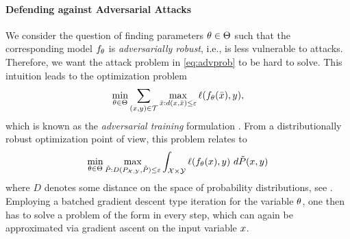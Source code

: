\paragraph{Defending against Adversarial Attacks}
%
%
We consider the question of finding parameters $\theta\in\Theta$ such that the corresponding model $f_\theta$ is \emph{adversarially robust}, i.e., is less vulnerable to attacks. Therefore, we want the attack problem in \cref{eq:advprob} to be hard to solve. This intuition leads to the optimization problem
%
\begin{align*}
\min_{\theta\in\Theta} \sum_{(x,y)\in \mathcal{T}} \max_{\bar{x}:d(x,\bar{x})\leq\varepsilon} \ell(f_\theta(\bar{x}), y),
\end{align*}
%
which is known as the \emph{adversarial training} formulation \cite{kurakin2016adversarial2, madry2017towards}. From a distributionally robust optimization point of view, this problem relates to 
%
\begin{align*}
\min_{\param\in\Param} \max_{\tilde P: D(P_{\Inp,\Oup}, \tilde P)\leq\budget} \int_{\Inp\times\Oup} \ell(\net_\param(\inp), \oup)\ d\tilde{P}(\inp,\oup)
\end{align*}
%
where $D$ denotes some distance on the space of probability distributions, see \cite{bungert2023geometry}. Employing a batched gradient descent type iteration for the variable $\theta$, one then has to solve a problem of the form  in every step, which can again be approximated via gradient ascent on the input variable $x$.
%
%
%
